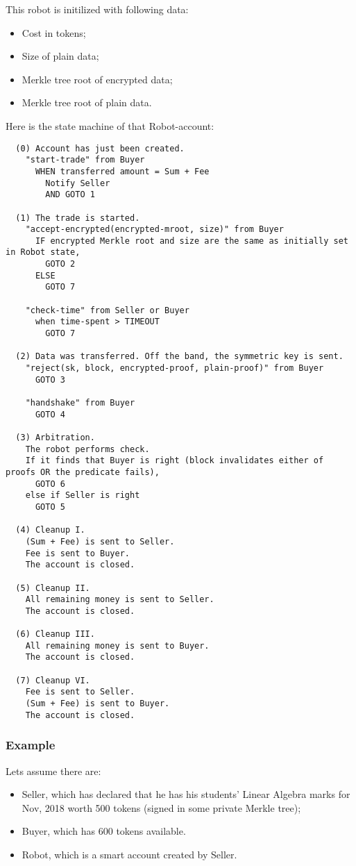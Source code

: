 This robot is initilized with following data:
\begin{itemize}
  \item Cost in tokens;
  \item Size of plain data;
  \item Merkle tree root of encrypted data;
  \item Merkle tree root of plain data.
\end{itemize}

Here is the state machine of that Robot-account:

\begin{verbatim}
  (0) Account has just been created.
    "start-trade" from Buyer
      WHEN transferred amount = Sum + Fee
        Notify Seller
        AND GOTO 1

  (1) The trade is started.
    "accept-encrypted(encrypted-mroot, size)" from Buyer
      IF encrypted Merkle root and size are the same as initially set in Robot state,
        GOTO 2
      ELSE
        GOTO 7

    "check-time" from Seller or Buyer
      when time-spent > TIMEOUT
        GOTO 7

  (2) Data was transferred. Off the band, the symmetric key is sent.
    "reject(sk, block, encrypted-proof, plain-proof)" from Buyer
      GOTO 3

    "handshake" from Buyer
      GOTO 4

  (3) Arbitration.
    The robot performs check.
    If it finds that Buyer is right (block invalidates either of proofs OR the predicate fails),
      GOTO 6
    else if Seller is right
      GOTO 5

  (4) Cleanup I.
    (Sum + Fee) is sent to Seller.
    Fee is sent to Buyer.
    The account is closed.

  (5) Cleanup II.
    All remaining money is sent to Seller.
    The account is closed.

  (6) Cleanup III.
    All remaining money is sent to Buyer.
    The account is closed.

  (7) Cleanup VI.
    Fee is sent to Seller.
    (Sum + Fee) is sent to Buyer.
    The account is closed.

\end{verbatim}

\subsubsection{Example}

Lets assume there are:
\begin{itemize}
  \item Seller, which has declared that he has his students' Linear Algebra marks for Nov, 2018 worth 500 tokens (signed in some private Merkle tree);
  \item Buyer, which has 600 tokens available.
  \item Robot, which is a smart account created by Seller.
\end{itemize}

